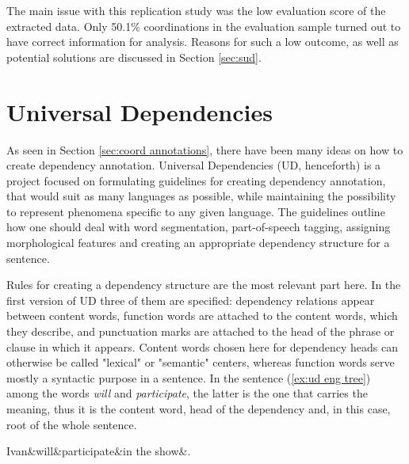 The main issue with this replication study was the low evaluation score of the extracted data. Only 50.1\% coordinations in the evaluation sample turned out to have correct information for analysis. Reasons for such a low outcome, as well as potential solutions are discussed in Section \ref{sec:sud}.

\section{Universal Dependencies}\label{sec:ud}

As seen in Section \ref{sec:coord annotations}, there have been many ideas on how to create dependency annotation. Universal Dependencies (UD, henceforth) is a project focused on formulating guidelines for creating dependency annotation, that would suit as many languages as possible, while maintaining the possibility to represent phenomena specific to any given language. The guidelines outline how one should deal with word segmentation, part-of-speech tagging, assigning morphological features and creating an appropriate dependency structure for a sentence. 

Rules for creating a dependency structure are the most relevant part here. In the first version of UD \citep{ud1} three of them are specified: dependency relations appear between content words, function words are attached to the content words, which they describe, and punctuation marks are attached to the head of the phrase or clause in which it appears. Content words chosen here for dependency heads can otherwise be called "lexical" or "semantic" centers, whereas function words serve mostly a syntactic purpose in a sentence. In the sentence (\ref{ex:ud eng tree}) among the words \textsl{will} and \textsl{participate}, the latter is the one that carries the meaning, thus it is the content word, head of the dependency and, in this case, root of the whole sentence.

\begin{exe}
    \ex
    \label{ex:ud eng tree}
    \begin{dependency}[theme = simple]
        \begin{deptext}
            Ivan\&will\&participate\&in the show\&.\\
        \end{deptext}
    \end{dependency}
\end{exe}

